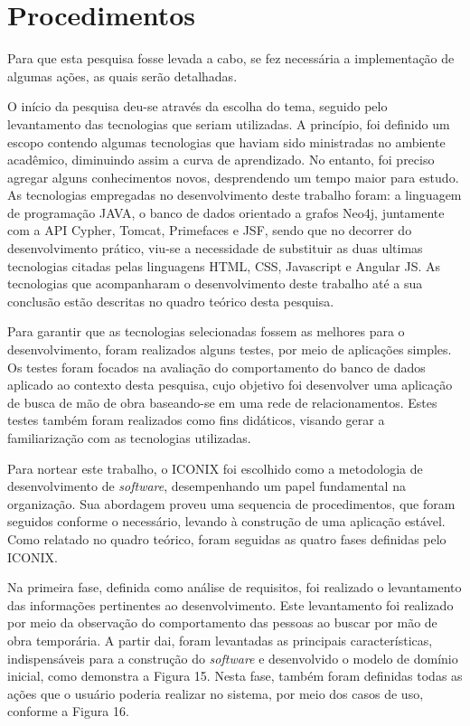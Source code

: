 \section{Procedimentos}

\par Para que esta pesquisa fosse levada a cabo, se fez necessária a implementação de algumas ações, as quais serão detalhadas.

\par O início da pesquisa deu-se através da escolha do tema, seguido pelo levantamento das tecnologias que seriam utilizadas. A princípio, foi definido um escopo contendo algumas tecnologias que haviam sido ministradas no ambiente acadêmico, diminuindo assim a curva de aprendizado. No entanto, foi preciso agregar alguns conhecimentos novos, desprendendo um tempo maior para estudo. As tecnologias empregadas no desenvolvimento deste trabalho foram: a linguagem de programação JAVA, o banco de dados orientado a grafos Neo4j, juntamente com a API Cypher, Tomcat, Primefaces e JSF, sendo que no decorrer do desenvolvimento prático, viu-se a necessidade de substituir as duas ultimas tecnologias citadas pelas linguagens HTML, CSS, Javascript e Angular JS. As tecnologias que acompanharam o desenvolvimento deste trabalho até a sua conclusão estão descritas no quadro teórico desta pesquisa.

\par Para garantir que as tecnologias selecionadas fossem as melhores para o desenvolvimento, foram realizados alguns testes, por meio de aplicações simples. Os testes foram focados na avaliação do comportamento do banco de dados aplicado ao contexto desta pesquisa, cujo objetivo foi desenvolver uma aplicação de busca de mão de obra baseando-se em uma rede de relacionamentos. Estes testes também foram realizados como fins didáticos, visando gerar a familiarização com as tecnologias utilizadas.

\par Para nortear este trabalho, o ICONIX foi escolhido como a metodologia de desenvolvimento de \textit{software}, desempenhando um papel fundamental na organização. Sua abordagem proveu uma sequencia de procedimentos, que foram seguidos conforme o necessário, levando à construção de uma aplicação estável. Como relatado no quadro teórico, foram seguidas as quatro fases definidas pelo ICONIX.

\par Na primeira fase, definida como análise de requisitos, foi realizado o levantamento das informações pertinentes ao desenvolvimento. Este levantamento foi realizado por meio da observação do comportamento das pessoas ao buscar por mão de obra temporária. A partir dai, foram levantadas as principais características, indispensáveis para a construção do \textit{software} e desenvolvido o modelo de domínio inicial, como demonstra a Figura 15. Nesta fase, também foram definidas todas as ações que o usuário poderia realizar no sistema, por meio dos casos de uso, conforme a Figura 16.

